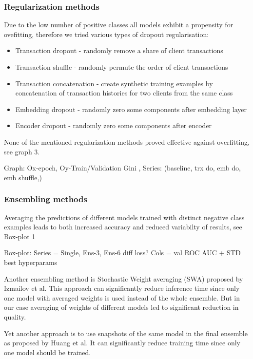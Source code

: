 \documentclass{sigkddExp}
\begin{document}
\subsubsection{Regularization methods}

Due to the low number of positive classes all models exhibit a propensity for ovefitting, therefore we tried various types of dropout regularisation:
\begin{itemize}
\item Transaction dropout - randomly remove a share of client transactions
\item Transaction shuffle - randomly permute the order of client transactions
\item Transaction concatenation - create synthetic training examples by concatenation of transaction histories for two clients from the same class
\item Embedding dropout - randomly zero some components after embedding layer
\item Encoder dropout - randomly zero some components after encoder
\end{itemize}
None of the mentioned regularization methods proved effective against overfitting, see graph 3.

Graph: Ox-epoch, Oy-Train/Validation Gini , Series: (baseline, trx do, emb do, emb shuffle,)

\subsubsection{Ensembling methods}

Averaging the predictions of different models trained with distinct negative class examples leads to both increased accuracy and reduced variabilty of results, see Box-plot 1

Box-plot: Series = {Single, Ens-3, Ens-6  diff loss? } Cols = {val ROC AUC + STD}
best hyperparams

Another ensembling method is Stochastic Weight averaging (SWA) proposed by Izmailov et al.\cite{DBLP:journals/corr/LoshchilovH16a} This approach can significantly reduce inference time since only one model with averaged weights is used instead of the whole ensemble. But in our case averaging of weights of different models led to significant reduction in quality.

Yet another approach is to use snapshots of the same model in the final ensemble as proposed by Huang et al.\cite{DBLP:journals/corr/HuangLPLHW17} It can significantly reduce training time since only one model should be trained.
\end{document}
